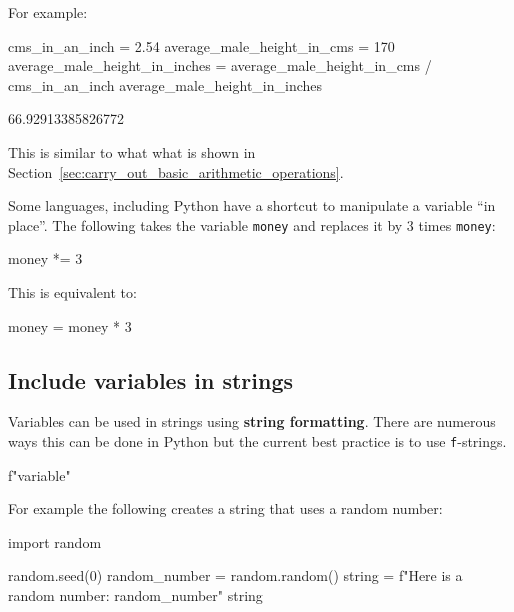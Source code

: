 For example:





\begin{pyin}
cms_in_an_inch = 2.54
average_male_height_in_cms = 170
average_male_height_in_inches = average_male_height_in_cms / cms_in_an_inch
average_male_height_in_inches
\end{pyin}





\begin{raw}
66.92913385826772
\end{raw}







This is similar to what what is shown in Section~\ref{sec:carry_out_basic_arithmetic_operations}.

Some languages, including Python have a shortcut to manipulate a variable “in
place”. The following takes the variable \texttt{money} and replaces it by 3 times
\texttt{money}:

\begin{pyin}
money *= 3
\end{pyin}


This is equivalent to:

\begin{pyin}
money = money * 3
\end{pyin}


\subsection{Include variables in strings}

Variables can be used in strings using \textbf{string formatting}. There are numerous
ways this can be done in Python but the current best practice is to use
\texttt{f}-strings.


\begin{pyin}
f"{variable}"
\end{pyin}



For example the following creates a string that uses a random number:




\begin{pyin}
import random

random.seed(0)
random_number = random.random()
string = f"Here is a random number: {random_number}"
string
\end{pyin}





